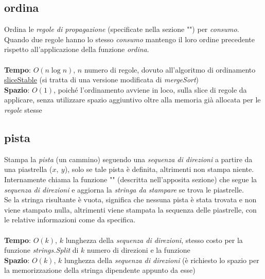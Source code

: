 \documentclass{article}
\begin{document}
\subsection{ordina}
Ordina le \textit{regole di propagazione} (specificate nella sezione "") per \textit{consumo}.\\
Quando due regole hanno lo stesso \textit{consumo} mantengo il loro ordine precedente rispetto all'applicazione della funzione \textit{ordina}.\\ \\
\textbf{Tempo}: \(O(n \log n)\), \(n\) numero di regole, dovuto all'algoritmo di ordinamento \href{https://pkg.go.dev/sort#SliceStable}{sliceStable} (si tratta di una versione modificata di \textit{mergeSort})\\
\textbf{Spazio}: \(O(1)\), poiché l'ordinamento avviene in loco, sulla slice di regole da applicare, senza utilizzare spazio aggiuntivo oltre alla memoria già allocata per le \textit{regole} stesse

\subsection{pista}
Stampa la \textit{pista} (un cammino) seguendo una \textit{sequenza di direzioni} a partire da una piastrella (\(x,\ y\)), solo se tale pista è definita, altrimenti non stampa niente.\\
Internamente chiama la funzione "" (descritta nell'apposita sezione) che segue la \textit{sequenza di direzioni} e aggiorna la \textit{stringa da stampare} se trova le piastrelle.\\
Se la stringa risultante è vuota, significa che nessuna pista è stata trovata e non viene stampato nulla, altrimenti viene stampata la sequenza delle piastrelle, con le relative informazioni come da specifica.\\
\\
\textbf{Tempo}: \(O(k)\), \(k\) lunghezza della \textit{sequenza di direzioni}, stesso costo per la funzione \textit{strings.Split} di \(k\) numero di direzioni e la funzione \\
\textbf{Spazio}: \(O(k)\), \(k\) lunghezza della \textit{sequenza di direzioni} (è richiesto lo spazio per la memorizzazione della stringa dipendente appunto da esse)
\end{document}
